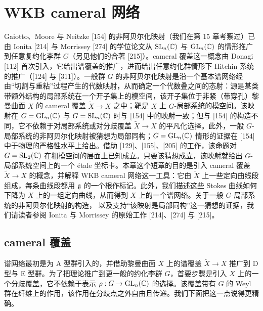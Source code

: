 \chapter{WKB cameral 网络}


Gaiotto、Moore 与 Neitzke [154] 的非阿贝尔化映射（我们在第 15 章考察过）已由 Ionita [214] 与 Morrissey [274] 的学位论文从 $\operatorname{SL}_n(\mathbb{C})$ 与 $\operatorname{GL}_n(\mathbb{C})$ 的情形推广到任意复约化李群 $G$（另见他们的合著 [215]）。cameral 覆盖这一概念由 Donagi [112] 首次引入，它给出谱覆盖的推广，进而给出任意约化群情形下 Hitchin 系统的推广（[124] 与 [311]）。一般群 $G$ 的非阿贝尔化映射是沿一个基本谱网络经由“切割与重粘”过程产生的代数映射，从而确定一个代数叠之间的态射：源是某类带额外结构的局部系统在一个开子集上的模空间，该开子集位于非紧（带穿孔）黎曼曲面 $X$ 的 cameral 覆盖 $\tilde X\to X$ 之中；靶是 $X$ 上 $G$-局部系统的模空间。该映射在 $G=\operatorname{GL}_n(\mathbb{C})$ 与 $G=\operatorname{SL}_n(\mathbb{C})$ 时与 [154] 中的映射一致；但与 [154] 的构造不同，它不依赖于对局部系统或对分歧覆盖 $\tilde X\to X$ 的平凡化选择。此外，一般 $G$-局部系统的非阿贝尔化映射被猜想为局部同构；$G=\operatorname{GL}_n(\mathbb{C})$ 情形的证据在 [154] 中于物理的严格性水平上给出。借助 [129]、[155]、[205] 的工作，该命题对 $G=\operatorname{SL}_2(\mathbb{C})$ 在粗模空间的层面上已知成立。只要该猜想成立，该映射就给出 $G$-局部系统空间上的一个 étale 坐标卡。本章这个短章的目的是引入 cameral 覆盖 $\tilde X\to X$ 的概念，并解释 WKB cameral 网络这一工具：它由 $\tilde X$ 上一些定向曲线段组成，每条曲线段都用 $\mathfrak{g}$ 的一个根作标记。此外，我们描述这些 Stokes 曲线如何下降为 $X$ 上的一组定向曲线，从而得到 $X$ 上的一个谱网络。关于一般 $G$-局部系统的非阿贝尔化映射的构造，
以及支持“该映射是局部同构”这一猜想的证据，我们请读者参阅 Ionita 与 Morrissey 的原始工作 [214]、[274] 与 [215]。

\section{cameral 覆盖}

谱网络最初是为 A 型群引入的，并借助黎曼曲面 $X$ 上的谱覆盖 $\tilde X\to X$ 推广到 D 型与 E 型群。为了把理论推广到更一般的约化李群 $G$，首要步骤是引入 $X$ 上的一个分歧覆盖，它不依赖于表示 $\rho:G\to\operatorname{GL}_n(\mathbb{C})$ 的选择。该覆盖带有 $G$ 的 Weyl 群在纤维上的作用，该作用在分歧点之外自由且传递。我们下面把这一点说得更精确。

